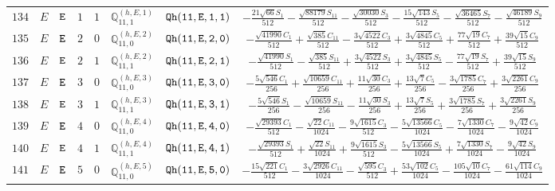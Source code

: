 \documentclass[fleqn,8pt]{jsarticle}
\begin{document}
\begin{table}[ht!]
\begin{center}
\begin{tabular}{cccccccc}
$ 134 $ & $ E $ & $ {\tt E} $ & $ 1 $ & $ 1 $ & $ \mathbb{Q}_{11,1}^{(h,E,1)} $ & $ {\tt Qh(11,E,1,1)} $ & $ - \frac{21 \sqrt{66} S_{1}}{512} - \frac{\sqrt{88179} S_{11}}{512} - \frac{\sqrt{30030} S_{3}}{512} - \frac{15 \sqrt{143} S_{5}}{512} - \frac{\sqrt{36465} S_{7}}{512} - \frac{\sqrt{46189} S_{9}}{512} $ \\
$ 135 $ & $ E $ & $ {\tt E} $ & $ 2 $ & $ 0 $ & $ \mathbb{Q}_{11,0}^{(h,E,2)} $ & $ {\tt Qh(11,E,2,0)} $ & $ - \frac{\sqrt{41990} C_{1}}{512} + \frac{\sqrt{385} C_{11}}{512} - \frac{3 \sqrt{4522} C_{3}}{512} + \frac{3 \sqrt{4845} C_{5}}{512} + \frac{77 \sqrt{19} C_{7}}{512} + \frac{39 \sqrt{15} C_{9}}{512} $ \\
$ 136 $ & $ E $ & $ {\tt E} $ & $ 2 $ & $ 1 $ & $ \mathbb{Q}_{11,1}^{(h,E,2)} $ & $ {\tt Qh(11,E,2,1)} $ & $ - \frac{\sqrt{41990} S_{1}}{512} - \frac{\sqrt{385} S_{11}}{512} + \frac{3 \sqrt{4522} S_{3}}{512} + \frac{3 \sqrt{4845} S_{5}}{512} - \frac{77 \sqrt{19} S_{7}}{512} + \frac{39 \sqrt{15} S_{9}}{512} $ \\
$ 137 $ & $ E $ & $ {\tt E} $ & $ 3 $ & $ 0 $ & $ \mathbb{Q}_{11,0}^{(h,E,3)} $ & $ {\tt Qh(11,E,3,0)} $ & $ - \frac{5 \sqrt{546} C_{1}}{256} + \frac{\sqrt{10659} C_{11}}{256} + \frac{11 \sqrt{30} C_{3}}{256} + \frac{13 \sqrt{7} C_{5}}{256} - \frac{3 \sqrt{1785} C_{7}}{256} + \frac{3 \sqrt{2261} C_{9}}{256} $ \\
$ 138 $ & $ E $ & $ {\tt E} $ & $ 3 $ & $ 1 $ & $ \mathbb{Q}_{11,1}^{(h,E,3)} $ & $ {\tt Qh(11,E,3,1)} $ & $ - \frac{5 \sqrt{546} S_{1}}{256} - \frac{\sqrt{10659} S_{11}}{256} - \frac{11 \sqrt{30} S_{3}}{256} + \frac{13 \sqrt{7} S_{5}}{256} + \frac{3 \sqrt{1785} S_{7}}{256} + \frac{3 \sqrt{2261} S_{9}}{256} $ \\
$ 139 $ & $ E $ & $ {\tt E} $ & $ 4 $ & $ 0 $ & $ \mathbb{Q}_{11,0}^{(h,E,4)} $ & $ {\tt Qh(11,E,4,0)} $ & $ - \frac{\sqrt{29393} C_{1}}{512} - \frac{\sqrt{22} C_{11}}{1024} - \frac{9 \sqrt{1615} C_{3}}{512} - \frac{5 \sqrt{13566} C_{5}}{1024} - \frac{7 \sqrt{1330} C_{7}}{1024} - \frac{9 \sqrt{42} C_{9}}{1024} $ \\
$ 140 $ & $ E $ & $ {\tt E} $ & $ 4 $ & $ 1 $ & $ \mathbb{Q}_{11,1}^{(h,E,4)} $ & $ {\tt Qh(11,E,4,1)} $ & $ - \frac{\sqrt{29393} S_{1}}{512} + \frac{\sqrt{22} S_{11}}{1024} + \frac{9 \sqrt{1615} S_{3}}{512} - \frac{5 \sqrt{13566} S_{5}}{1024} + \frac{7 \sqrt{1330} S_{7}}{1024} - \frac{9 \sqrt{42} S_{9}}{1024} $ \\
$ 141 $ & $ E $ & $ {\tt E} $ & $ 5 $ & $ 0 $ & $ \mathbb{Q}_{11,0}^{(h,E,5)} $ & $ {\tt Qh(11,E,5,0)} $ & $ - \frac{15 \sqrt{221} C_{1}}{512} - \frac{3 \sqrt{2926} C_{11}}{1024} - \frac{\sqrt{595} C_{3}}{512} + \frac{53 \sqrt{102} C_{5}}{1024} - \frac{105 \sqrt{10} C_{7}}{1024} - \frac{61 \sqrt{114} C_{9}}{1024} $ \\

\end{tabular}
\end{center}
\end{table}
\end{document}
